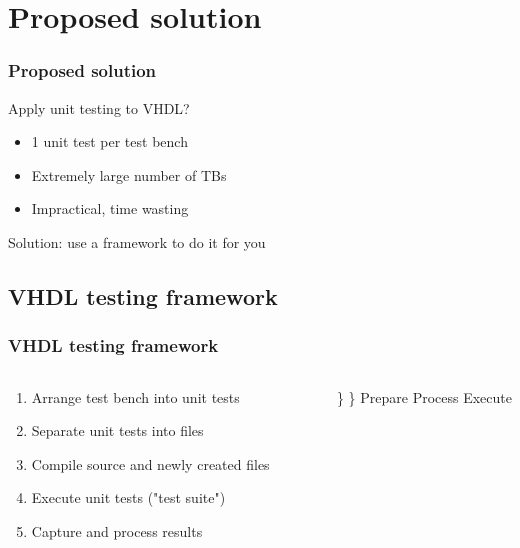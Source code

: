 \documentclass[british,10pt]{beamer}
\begin{document}
\section{Proposed solution}
\begin{frame}\frametitle{Proposed solution}
Apply unit testing to VHDL?
\begin{itemize}
\item[\ding{222}] 1 unit test per test bench
\item[\ding{222}] Extremely large number of TBs
\item[\ding{222}] Impractical, time wasting
\end{itemize}
\vskip5pt
Solution: use a framework to do it for you
\end{frame}

\subsection{VHDL testing framework}
\begin{frame}\frametitle{VHDL testing framework}
\begin{columns}
\begin{column}{0.60\textwidth}
\begin{enumerate}
\item Arrange test bench into unit tests
\item Separate unit tests into files
\item Compile source and newly created files
\item Execute unit tests ("test suite")
\item Capture and process results
\end{enumerate}
\end{column}
\vskip12pt
\Huge\}
\vskip1pt
\}
 Prepare
\vskip13pt
 Process
\vskip17pt
 Execute
\end{columns}
\end{frame}
\end{document}
